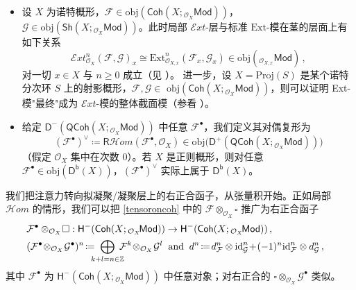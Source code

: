 \begin{Rem}
\begin{itemize}[leftmargin=0.5cm]
	\item 设 $X$ 为诺特概形，$\mathcal{F}\in\text{obj}(\mathsf{Coh}(X;{}_{\mathcal{O}_X}\!\mathsf{Mod}))$，$\mathcal{G}\in\text{obj}(\mathsf{Sh}(X;{}_{\mathcal{O}_X}\mathsf{Mod}))$。此时局部 $\mathcal{E}xt$-层与标准 $\text{Ext}$-模在茎的层面上有如下关系
	\[
	\mathcal{E}xt_{\mathcal{O}_X}^n(\mathcal{F},\mathcal{G})_x\cong\text{Ext}_{\mathcal{O}_{X,x}}^n(\mathcal{F}_x,\mathcal{G}_x)\in\text{obj}({}_{\mathcal{O}_{X,x}}\!\mathsf{Mod})\,,
	\]
	对一切 $x\in X$ 与 $n\geq 0$ 成立（见 \cite[Proposition III.6.8]{[Har77]}）。
	\newline 进一步，设 $X=\text{Proj}(S)$ 是某个诺特分次环 $S$ 上的射影概形，$\mathcal{F},\mathcal{G}\in$ $\text{obj}(\mathsf{Coh}(X;{}_{\mathcal{O}_X}\!\mathsf{Mod}))$，则可以证明 Ext-模"最终"成为 $\mathcal{E}xt$-模的整体截面模（参看 \cite[Proposition III.6.9]{[Har77]}）。
	
	\item 给定 $\mathsf{D^-}(\mathsf{QCoh}(X;{}_{\mathcal{O}_X}\!\mathsf{Mod}))$ 中任意 $\mathcal{F}^\bullet$，我们定义其对偶复形为 
	\begin{equation}
		(\mathcal{F}^\bullet)^\vee\coloneqq\mathsf{R}\mathcal{H}om(\mathcal{F}^\bullet,\mathcal{O}_X)\in\text{obj}\big(\mathsf{D^+}(\mathsf{QCoh}(X;{}_{\mathcal{O}_X}\!\mathsf{Mod}))\big)
	\end{equation}
	（假定 $\mathcal{O}_X$ 集中在次数 0）。若 $X$ 是正则概形，则对任意 $\mathcal{F}^\bullet\in\text{obj}(\mathsf{D^b}(X))$，$(\mathcal{F}^\bullet)^\vee$ 实际上属于 $\mathsf{D^b}(X)$。
\end{itemize}
\end{Rem}

\vspace*{0.7cm}
\noindent 我们把注意力转向拟凝聚/凝聚层上的右正合函子，从张量积开始。正如局部 $\mathcal{H}om$ 的情形，我们可以把 \eqref{tensoroncoh} 中的 $\mathcal{F}\otimes_{\mathcal{O}_X}\!\square$ 推广为右正合函子
\begin{equation}
\begin{aligned}
	&\mkern-18mu\mathcal{F}^\bullet\otimes_{\mathcal{O}_X}\!\square:\mathsf{H^-}(\mathsf{Coh}(X;{}_{\mathcal{O}_X}\!\mathsf{Mod}))\rightarrow\mathsf{H^-}(\mathsf{Coh}(X;{}_{\mathcal{O}_X}\!\mathsf{Mod}))\,, \\
	&\mkern-18mu(\mathcal{F}^\bullet\!\otimes_{\mathcal{O}_X}\!\mathcal{G}^\bullet)^n\!\coloneqq \mkern-12mu\bigoplus_{k+l=n\in\mathbb{Z}}\mkern-12mu\mathcal{F}^k\!\otimes_{\mathcal{O}_X}\!\mathcal{G}^l \;\;\text{and}\;\; d^n\!\coloneqq\!d_\mathcal{F}^n\otimes\text{id}_\mathcal{G}^n \!+\!(-1)^n \text{id}_\mathcal{F}^n\otimes d_\mathcal{G}^n\,,
\end{aligned}
\end{equation}
其中 $\mathcal{F}^\bullet$ 为 $\mathsf{H^-}(\mathsf{Coh}(X;{}_{\mathcal{O}_X}\!\mathsf{Mod}))$ 中任意对象；对右正合的 $\square\!\otimes_{\mathcal{O}_X}\mathcal{G}^\bullet$ 类似。

